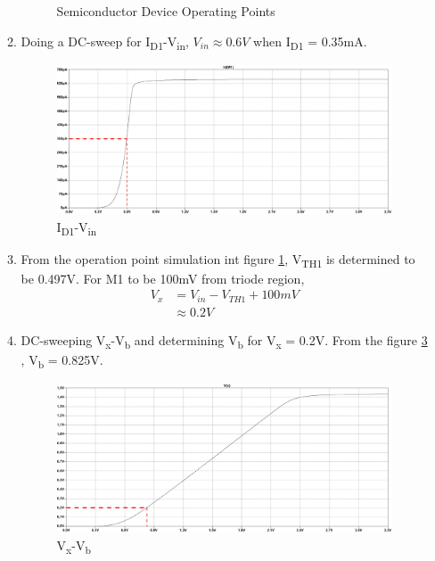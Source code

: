 \documentclass{article}
\begin{document}
\begin{enumerate}[(a)]
\begin{enumerate}[1.]
\begin{figure}[H]
\caption{\label{fig:errorlog-q5}Semiconductor Device Operating Points}
\end{figure}
\item Doing a DC-sweep for I\textsubscript{D1}-V\textsubscript{in}, \(V_{in}\approx0.6V\) when I\textsubscript{D1} = 0.35mA.
\begin{figure}[H]
\centering
\includegraphics[width=.9\linewidth]{img/q5/id-vin.pdf}
\caption{\label{fig:id-vin-q5}I\textsubscript{D1}-V\textsubscript{in}}
\end{figure}
\item From the operation point simulation int figure \ref{fig:errorlog-q5}, V\textsubscript{TH1} is determined to be 0.497V. For M1 to be 100mV from triode region,
\begin{equation*}
\begin{aligned}
V_{x} &= V_{in} - V_{TH1} + 100mV \\
&\approx 0.2 V
\end{aligned}
\end{equation*}
\item DC-sweeping V\textsubscript{x}-V\textsubscript{b} and determining V\textsubscript{b} for V\textsubscript{x} = 0.2V. From the figure \ref{fig:vx-vb-q5} , V\textsubscript{b} = 0.825V.
\begin{figure}[H]
\centering
\includegraphics[width=.9\linewidth]{img/q5/vx-vin-q5.pdf}
\caption{\label{fig:vx-vb-q5}V\textsubscript{x}-V\textsubscript{b}}
\end{figure}
\end{enumerate}


\end{enumerate}
\end{document}
